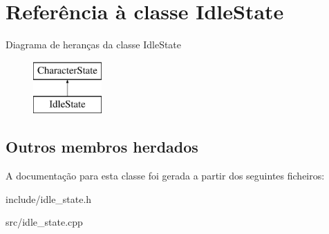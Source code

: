 \hypertarget{classIdleState}{}\section{Referência à classe Idle\+State}
\label{classIdleState}
Diagrama de heranças da classe Idle\+State\begin{figure}[H]
\begin{center}
\leavevmode
\includegraphics[height=2.000000cm]{classIdleState}
\end{center}
\end{figure}
\subsection*{Outros membros herdados}


A documentação para esta classe foi gerada a partir dos seguintes ficheiros\+:\begin{DoxyCompactItemize}
\item 
include/idle\+\_\+state.\+h\item 
src/idle\+\_\+state.\+cpp\end{DoxyCompactItemize}
